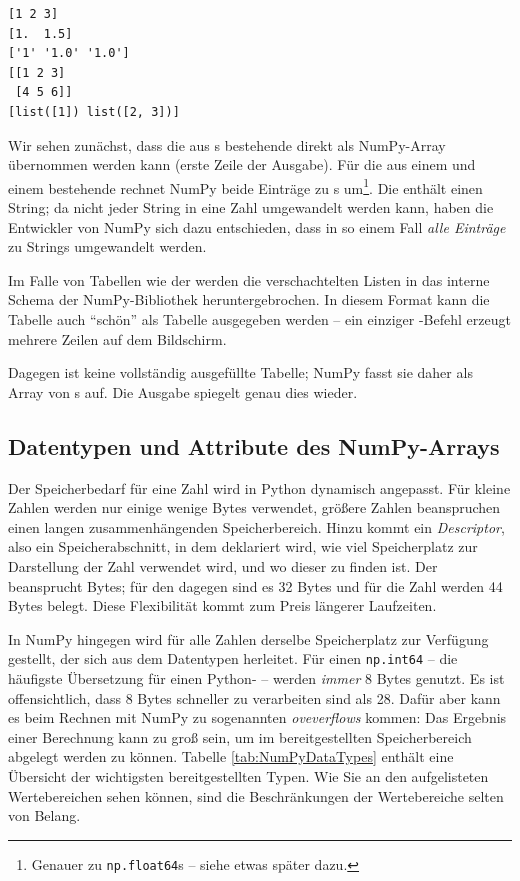 \begin{cmdbox}
\begin{verbatim}
[1 2 3]
[1.  1.5]
['1' '1.0' '1.0']
[[1 2 3]
 [4 5 6]]
[list([1]) list([2, 3])]
\end{verbatim}
\end{cmdbox}

Wir sehen zunächst, dass die aus s bestehende  direkt als NumPy-Array übernommen werden kann (erste Zeile der Ausgabe). Für die aus einem  und einem  bestehende  rechnet NumPy beide Einträge zu s um\footnote{Genauer zu \texttt{np.float64}s -- siehe etwas später dazu.}. Die  enthält einen String; da nicht jeder String in eine Zahl umgewandelt werden kann, haben die Entwickler von NumPy sich dazu entschieden, dass in so einem Fall \emph{alle Einträge} zu Strings umgewandelt werden.

Im Falle von Tabellen wie der  werden die verschachtelten Listen in das interne Schema der NumPy-Bibliothek heruntergebrochen. In diesem Format kann die Tabelle auch \enquote{schön} als Tabelle ausgegeben werden -- ein einziger -Befehl erzeugt mehrere Zeilen auf dem Bildschirm.

Dagegen ist  keine vollständig ausgefüllte Tabelle; NumPy fasst sie daher als Array von s auf. Die Ausgabe spiegelt genau dies wieder.

\subsection{Datentypen und Attribute des NumPy-Arrays}
Der Speicherbedarf für eine Zahl wird in Python dynamisch angepasst. Für kleine Zahlen werden nur einige wenige Bytes verwendet, größere Zahlen beanspruchen einen langen zusammenhängenden Speicherbereich. Hinzu kommt ein \emph{Descriptor}, also ein Speicherabschnitt, in dem deklariert wird, wie viel Speicherplatz zur Darstellung der Zahl verwendet wird, und wo dieser zu finden ist. Der  beansprucht  Bytes; für den  dagegen sind es 32 Bytes und für die Zahl  werden 44 Bytes belegt. Diese Flexibilität kommt zum Preis längerer Laufzeiten.

In NumPy hingegen wird für alle Zahlen derselbe Speicherplatz zur Verfügung gestellt, der sich aus dem Datentypen herleitet. Für einen \texttt{np.int64} -- die häufigste Übersetzung für einen Python- -- werden \emph{immer} 8 Bytes genutzt. Es ist offensichtlich, dass 8 Bytes schneller zu verarbeiten sind als 28. Dafür aber kann es beim Rechnen mit NumPy zu sogenannten \emph{oveverflows} kommen: Das Ergebnis einer Berechnung kann zu groß sein, um im bereitgestellten Speicherbereich abgelegt werden zu können. Tabelle \ref{tab:NumPyDataTypes} enthält eine Übersicht der wichtigsten bereitgestellten Typen. Wie Sie an den aufgelisteten Wertebereichen sehen können, sind die Beschränkungen der Wertebereiche selten von Belang.

